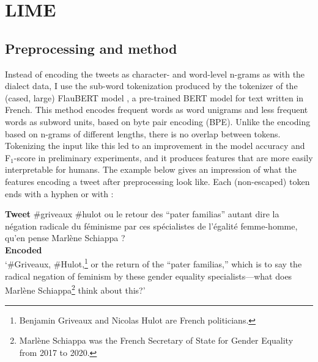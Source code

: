 
\section{LIME}
\label{sec:tweets-svm}

\subsection{Preprocessing and method}
\label{sec:tweets-svm-method}

Instead of encoding the tweets as character- and word-level n-grams as with the dialect data, I use the sub-word tokenization produced by the tokenizer of the (cased, large) FlauBERT model \citep{le2020flaubert}, a pre-trained BERT model for text written in French.
This method encodes frequent words as word unigrams and less frequent words as subword units, based on byte pair encoding (BPE).
Unlike the encoding based on n-grams of different lengths, there is no overlap between tokens.
Tokenizing the input like this led to an improvement in the model accuracy and F$_1$-score in preliminary experiments, and it produces features that are more easily interpretable for humans.
The example below gives an impression of what the features encoding a tweet after preprocessing look like.
Each (non-escaped) token ends with a hyphen or with \eow:

\begin{exe}
\ex 
\gll
\textbf{Tweet} \#griveaux \#hulot ou le retour des ``pater familias'' autant dire la négation radicale du féminisme par ces spécialistes de l'égalité femme-homme, qu'en pense Marlène Schiappa ?\\
\textbf{Encoded} \hashtag{} \hashtag{}     {  } {  }            { } { \ngram{-\eow}  \ngram{,\eow}} { }  { } { }  \\
\trans `\#Griveaux, \#Hulot,\footnote{%
Benjamin Griveaux and Nicolas Hulot are French politicians.}
or the return of the ``pater familias,'' which is to say the radical negation of feminism by these gender equality specialists---what does Marlène Schiappa\footnote{%
Marlène Schiappa was the French Secretary of State for Gender Equality from 2017 to 2020.}
think about this?'
\label{gloss:tweet-preprocessing}
\end{exe}

